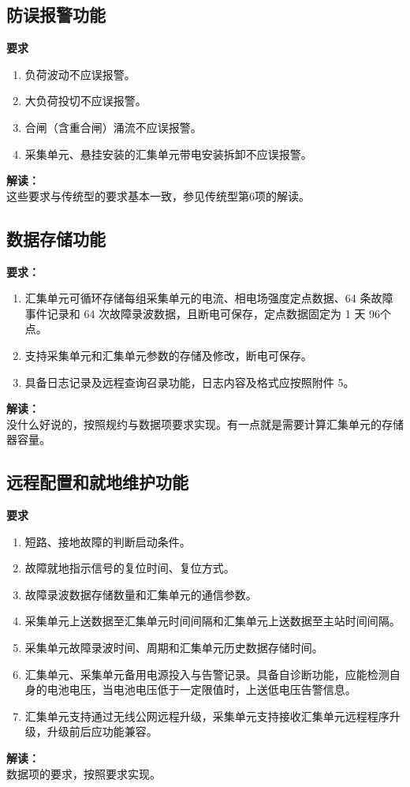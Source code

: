 \documentclass{article}
\begin{document}
\begin{CJK}{UTF8}{gbsn}
\subsection{ 防误报警功能 }
		\par
		\textbf{要求}
		\begin{enumerate}
		\item 负荷波动不应误报警。 
		\item 大负荷投切不应误报警。 
		\item 合闸（含重合闸）涌流不应误报警。 
		\item 采集单元、悬挂安装的汇集单元带电安装拆卸不应误报警。 
		\end{enumerate}
		\textbf{解读：}\\
		这些要求与传统型的要求基本一致，参见传统型第6项的解读。


\subsection{ 数据存储功能 }
		\par
		\textbf{要求：}
		\begin{enumerate}
		\item 汇集单元可循环存储每组采集单元的电流、相电场强度定点数据、64 条故障事件记录和 64 次故障录波数据，且断电可保存，定点数据固定为 1 天 96个点。 
		\item 支持采集单元和汇集单元参数的存储及修改，断电可保存。 
		\item 具备日志记录及远程查询召录功能，日志内容及格式应按照附件 5。 
		\end{enumerate}
		\textbf{解读：}\\
		没什么好说的，按照规约与数据项要求实现。有一点就是需要计算汇集单元的存储器容量。

\subsection{ 远程配置和就地维护功能 }
		\par
		\textbf{要求}
		\begin{enumerate}
		\item 短路、接地故障的判断启动条件。 
		\item 故障就地指示信号的复位时间、复位方式。 
		\item 故障录波数据存储数量和汇集单元的通信参数。 
		\item 采集单元上送数据至汇集单元时间间隔和汇集单元上送数据至主站时间间隔。 
		\item 采集单元故障录波时间、周期和汇集单元历史数据存储时间。 
		\item 汇集单元、采集单元备用电源投入与告警记录。具备自诊断功能，应能检测自身的电池电压，当电池电压低于一定限值时，上送低电压告警信息。 
		\item 汇集单元支持通过无线公网远程升级，采集单元支持接收汇集单元远程程序升级，升级前后应功能兼容。 
		\end{enumerate}
		\textbf{解读：}\\
		数据项的要求，按照要求实现。


\end{CJK}
\end{document}
